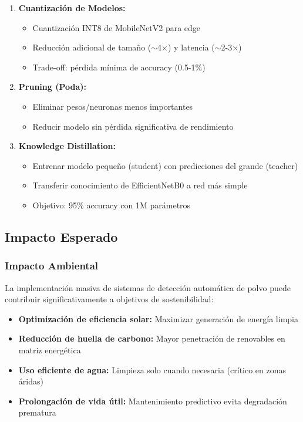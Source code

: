 \documentclass[11pt, a4paper]{article}
\begin{document}
\begin{enumerate}
    \item \textbf{Cuantización de Modelos:}
    \begin{itemize}
        \item Cuantización INT8 de MobileNetV2 para edge
        \item Reducción adicional de tamaño ($\sim$4×) y latencia ($\sim$2-3×)
        \item Trade-off: pérdida mínima de accuracy (0.5-1\%)
    \end{itemize}
    
    \item \textbf{Pruning (Poda):}
    \begin{itemize}
        \item Eliminar pesos/neuronas menos importantes
        \item Reducir modelo sin pérdida significativa de rendimiento
    \end{itemize}
    
    \item \textbf{Knowledge Distillation:}
    \begin{itemize}
        \item Entrenar modelo pequeño (student) con predicciones del grande (teacher)
        \item Transferir conocimiento de EfficientNetB0 a red más simple
        \item Objetivo: 95\% accuracy con 1M parámetros
    \end{itemize}
\end{enumerate}

\subsection{Impacto Esperado}

\subsubsection{Impacto Ambiental}

La implementación masiva de sistemas de detección automática de polvo puede contribuir significativamente a objetivos de sostenibilidad:

\begin{itemize}
    \item \textbf{Optimización de eficiencia solar:} Maximizar generación de energía limpia
    \item \textbf{Reducción de huella de carbono:} Mayor penetración de renovables en matriz energética
    \item \textbf{Uso eficiente de agua:} Limpieza solo cuando necesaria (crítico en zonas áridas)
    \item \textbf{Prolongación de vida útil:} Mantenimiento predictivo evita degradación prematura
\end{itemize}
\end{document}
